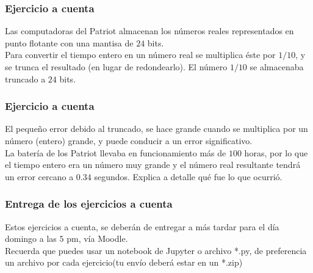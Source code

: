 \documentclass[12pt]{beamer}
\begin{document}
\begin{frame}
\frametitle{Ejercicio a cuenta}
Las computadoras del Patriot almacenan los números reales representados en punto flotante con una mantisa de $24$ bits.
\\
\bigskip
\pause
Para convertir el tiempo entero en un número real se multiplica éste por $1/10$, y se trunca el resultado (en lugar de redondearlo). El número $1/10$ se almacenaba truncado a $24$ bits.
\end{frame}
\begin{frame}
\frametitle{Ejercicio a cuenta}
El pequeño error debido al truncado, se hace grande cuando se multiplica por un número (entero) grande, y puede conducir a un error significativo.
\\
\bigskip
La batería de los Patriot llevaba en funcionamiento más de $100$ horas, por lo que el tiempo entero era un número muy grande y el número real resultante tendrá un error cercano a $0.34$ segundos. \pause Explica a detalle qué fue lo que ocurrió.
\end{frame}
\begin{frame}
\frametitle{Entrega de los ejercicios a cuenta}
Estos ejercicios a cuenta, se deberán de entregar a más tardar para el día domingo a las $5$  pm, vía Moodle.
\\
\bigskip
Recuerda que puedes usar un notebook de Jupyter o archivo *.py, de preferencia un archivo por cada ejercicio(tu envío deberá estar en un *.zip)
\end{frame}
\end{document}
